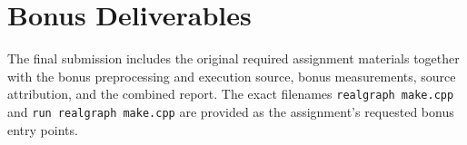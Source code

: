 \documentclass[11pt]{article}
\begin{document}
\section{Bonus Deliverables}
The final submission includes the original required assignment materials together with the bonus preprocessing and execution source, bonus measurements, source attribution, and the combined report. The exact filenames \texttt{realgraph make.cpp} and \texttt{run realgraph make.cpp} are provided as the assignment's requested bonus entry points.
\end{document}
